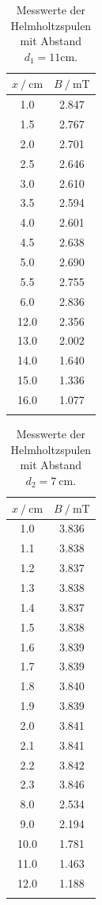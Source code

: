 \FloatBarrier
\begin{table}
\centering
\caption{Messwerte der Helmholtzspulen mit Abstand $d_1=11\si{\centi\meter}$.}
\begin{tabular}{cc}
\toprule
$x \:/\: \si{\centi\meter}$ & $B \:/\: \si{\milli\tesla}$ \\
\midrule
1.0 & 2.847 \\
1.5& 2.767\\
2.0& 2.701\\
2.5& 2.646\\
3.0& 2.610\\
3.5& 2.594\\
4.0& 2.601\\
4.5& 2.638\\
5.0& 2.690\\
5.5& 2.755\\
6.0& 2.836\\
12.0& 2.356\\
13.0& 2.002\\
14.0& 1.640\\
15.0& 1.336\\
16.0& 1.077\\
\bottomrule
\label{tab:helm1}
\end{tabular}
\end{table}

\begin{table}
\centering
\caption{Messwerte der Helmholtzspulen mit Abstand $d_2=\SI{7}{\centi\metre}$.}
\begin{tabular}{cc}
\toprule
$x \:/\: \si{\centi\metre}$ & $B \:/\: \si{\milli\tesla}$ \\
\midrule
1.0& 3.836  \\
1.1& 3.838\\
1.2& 3.837\\
1.3& 3.838\\
1.4& 3.837\\
1.5& 3.838\\
1.6& 3.839\\
1.7& 3.839\\
1.8& 3.840\\
1.9& 3.839\\
2.0& 3.841\\
2.1& 3.841\\
2.2& 3.842\\
2.3& 3.846\\
8.0& 2.534\\
9.0& 2.194\\
10.0& 1.781\\
11.0& 1.463\\
12.0& 1.188\\
\bottomrule
\label{tab:helm2}
\end{tabular}
\end{table}

